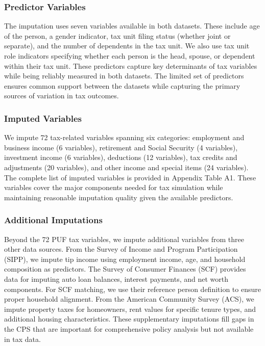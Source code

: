 \subsubsection{Predictor Variables}

The imputation uses seven variables available in both datasets. These include age of the person, a gender indicator, tax unit filing status (whether joint or separate), and the number of dependents in the tax unit. We also use tax unit role indicators specifying whether each person is the head, spouse, or dependent within their tax unit. These predictors capture key determinants of tax variables while being reliably measured in both datasets. The limited set of predictors ensures common support between the datasets while capturing the primary sources of variation in tax outcomes.

\subsubsection{Imputed Variables}

We impute 72 tax-related variables spanning six categories: employment and business income (6 variables), retirement and Social Security (4 variables), investment income (6 variables), deductions (12 variables), tax credits and adjustments (20 variables), and other income and special items (24 variables). The complete list of imputed variables is provided in Appendix Table A1. These variables cover the major components needed for tax simulation while maintaining reasonable imputation quality given the available predictors.

\subsubsection{Additional Imputations}

Beyond the 72 PUF tax variables, we impute additional variables from three other data sources. From the Survey of Income and Program Participation (SIPP), we impute tip income using employment income, age, and household composition as predictors. The Survey of Consumer Finances (SCF) provides data for imputing auto loan balances, interest payments, and net worth components. For SCF matching, we use their reference person definition to ensure proper household alignment. From the American Community Survey (ACS), we impute property taxes for homeowners, rent values for specific tenure types, and additional housing characteristics. These supplementary imputations fill gaps in the CPS that are important for comprehensive policy analysis but not available in tax data.

